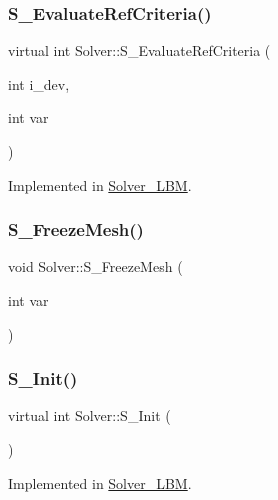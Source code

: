 \subsubsection{\texorpdfstring{S\+\_\+\+Evaluate\+Ref\+Criteria()}{S\_EvaluateRefCriteria()}}
{\footnotesize\ttfamily virtual int Solver\+::\+S\+\_\+\+Evaluate\+Ref\+Criteria (\begin{DoxyParamCaption}\item[{int}]{i\+\_\+dev,  }\item[{int}]{var }\end{DoxyParamCaption})\hspace{0.3cm}{\ttfamily [pure virtual]}}



Implemented in \hyperlink{classSolver__LBM_a8809dbbf5653c40202da0611afb6dcaa}{Solver\+\_\+\+L\+BM}.

\mbox{\label{classSolver_a1ef012d41bd8d8f7f29fd15a8587dac9}} 
\subsubsection{\texorpdfstring{S\+\_\+\+Freeze\+Mesh()}{S\_FreezeMesh()}}
{\footnotesize\ttfamily void Solver\+::\+S\+\_\+\+Freeze\+Mesh (\begin{DoxyParamCaption}\item[{int}]{var }\end{DoxyParamCaption})\hspace{0.3cm}{\ttfamily [inline]}}

\mbox{\label{classSolver_a354e0d709ec8c548be9e72add961c9f6}} 
\subsubsection{\texorpdfstring{S\+\_\+\+Init()}{S\_Init()}}
{\footnotesize\ttfamily virtual int Solver\+::\+S\+\_\+\+Init (\begin{DoxyParamCaption}{ }\end{DoxyParamCaption})\hspace{0.3cm}{\ttfamily [pure virtual]}}



Implemented in \hyperlink{classSolver__LBM_ac8195f75a91e0c41f3b7908cebc5c8d6}{Solver\+\_\+\+L\+BM}.

